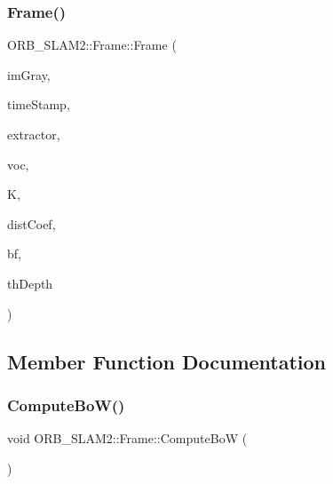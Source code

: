 \mbox{\label{class_o_r_b___s_l_a_m2_1_1_frame_a39a57316938495a9ca8a053edd74b414}} 
\subsubsection{\texorpdfstring{Frame()}{Frame()}\hspace{0.1cm}{\footnotesize\ttfamily [5/5]}}
{\footnotesize\ttfamily O\+R\+B\+\_\+\+S\+L\+A\+M2\+::\+Frame\+::\+Frame (\begin{DoxyParamCaption}\item[{const cv\+::\+Mat \&}]{im\+Gray,  }\item[{const double \&}]{time\+Stamp,  }\item[{\mbox{\hyperlink{class_o_r_b___s_l_a_m2_1_1_o_r_bextractor}{O\+R\+Bextractor}} $\ast$}]{extractor,  }\item[{\mbox{\hyperlink{namespace_o_r_b___s_l_a_m2_a2fafba714858cab1bb18d438e2e83c5d}{O\+R\+B\+Vocabulary}} $\ast$}]{voc,  }\item[{cv\+::\+Mat \&}]{K,  }\item[{cv\+::\+Mat \&}]{dist\+Coef,  }\item[{const float \&}]{bf,  }\item[{const float \&}]{th\+Depth }\end{DoxyParamCaption})}



\subsection{Member Function Documentation}
\mbox{\label{class_o_r_b___s_l_a_m2_1_1_frame_ac748d2318f9a409406dba4910ff5ef8e}} 
\subsubsection{\texorpdfstring{Compute\+Bo\+W()}{ComputeBoW()}}
{\footnotesize\ttfamily void O\+R\+B\+\_\+\+S\+L\+A\+M2\+::\+Frame\+::\+Compute\+BoW (\begin{DoxyParamCaption}{ }\end{DoxyParamCaption})}



